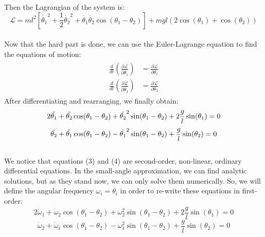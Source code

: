 \documentclass{article}
\begin{document}
Then the Lagrangian of the system is:
\begin{equation}
    \mathcal{L} = ml^2[\dot{\theta_1}^2 + \frac{1}{2}\dot{\theta_2}^2 + \dot{\theta_1}\dot{\theta_2}\cos(\theta_1-\theta_2)] + mgl(2\cos(\theta_1) + \cos(\theta_2))
\end{equation}
\\Now that the hard part is done, we can use the Euler-Lagrange equation to find the equations of motion:
\begin{align*}
\begin{split}
    \frac{d}{dt}(\frac{\partial\mathcal{L}}{\partial\dot{\theta_1}}) & = \frac{\partial\mathcal{L}}{\partial\theta_1} \\ 
        \frac{d}{dt}(\frac{\partial\mathcal{L}}{\partial\dot{\theta_2}}) & = \frac{\partial\mathcal{L}}{\partial\theta_2}
\end{split}
\end{align*}
After differentiating and rearranging, we finally obtain:
\begin{equation}
    2\Ddot{\theta_1} + \Ddot{\theta_2}\cos(\theta_1 - \theta_2) + \dot{\theta_2}^2\sin(\theta_1-\theta_2) + 2\frac{g}{l}\sin(\theta_1) = 0
\end{equation}
\begin{equation}
   \Ddot{\theta_2} + \Ddot{\theta_1}\cos(\theta_1 - \theta_2) - \dot{\theta_1}^2\sin(\theta_1-\theta_2) + \frac{g}{l}\sin(\theta_2) = 0
\end{equation}
\\We notice that equations (3) and (4) are second-order, non-linear, ordinary differential equations. In the small-angle approximation, we can find analytic solutions, but as they stand now, we can only solve them numerically. So, we will define the angular frequency $\omega_i = \dot{\theta_i}$ in order to re-write these equations in first-order:
\begin{equation}
    2\dot{\omega}_1 + \dot{\omega}_2\cos(\theta_1 - \theta_2) + \omega_2^2\sin(\theta_1-\theta_2) + 2\frac{g}{l}\sin(\theta_1) = 0
\end{equation}
\begin{equation}
   \dot{\omega}_2 + \dot{\omega}_1\cos(\theta_1 - \theta_2) - \omega_1^2\sin(\theta_1-\theta_2) + \frac{g}{l}\sin(\theta_2) = 0
\end{equation}
\end{document}
